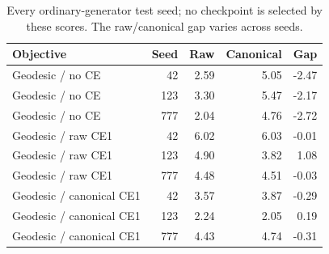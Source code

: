 \begin{table}[t]
\centering\small
\caption{Every ordinary-generator test seed; no checkpoint is selected by these scores. The raw/canonical gap varies across seeds.}
\label{tab:ordinaryseeds}
\begin{tabular}{lrrrr}\toprule
Objective&Seed&Raw&Canonical&Gap\\\midrule
Geodesic / no CE&42&2.59&5.05&-2.47\\
Geodesic / no CE&123&3.30&5.47&-2.17\\
Geodesic / no CE&777&2.04&4.76&-2.72\\
Geodesic / raw CE1&42&6.02&6.03&-0.01\\
Geodesic / raw CE1&123&4.90&3.82&1.08\\
Geodesic / raw CE1&777&4.48&4.51&-0.03\\
Geodesic / canonical CE1&42&3.57&3.87&-0.29\\
Geodesic / canonical CE1&123&2.24&2.05&0.19\\
Geodesic / canonical CE1&777&4.43&4.74&-0.31\\
\bottomrule\end{tabular}\end{table}
